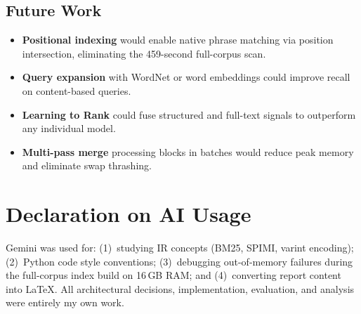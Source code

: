 \documentclass[sigconf,nonacm]{acmart}
\begin{document}
\subsection{Future Work}
\begin{itemize}[nosep]
  \item \textbf{Positional indexing} would enable native phrase matching via
        position intersection, eliminating the 459-second full-corpus scan.
  \item \textbf{Query expansion} with WordNet or word embeddings could
        improve recall on content-based queries.
  \item \textbf{Learning to Rank} could fuse structured and full-text signals
        to outperform any individual model.
  \item \textbf{Multi-pass merge} processing blocks in batches would reduce
        peak memory and eliminate swap thrashing.
\end{itemize}

\section*{Declaration on AI Usage}
Gemini was used for: (1)~studying IR concepts (BM25, SPIMI, varint encoding);
(2)~Python code style conventions; (3)~debugging out-of-memory failures during
the full-corpus index build on 16\,GB RAM; and (4)~converting report content
into \LaTeX{}.  All architectural decisions, implementation, evaluation, and
analysis were entirely my own work.



\end{document}
